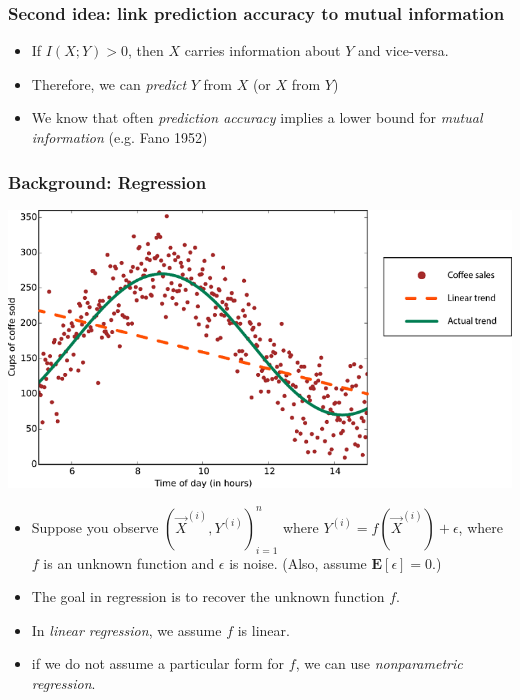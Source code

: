 \documentclass{beamer}
\newcommand{\E}{\textbf{E}}
\begin{document}
\begin{frame}
\frametitle{Second idea: link prediction accuracy to mutual information}
\begin{itemize}
\item If $I(X; Y) > 0$, then $X$ carries information about $Y$ and vice-versa. \pause
\item Therefore, we can \emph{predict} $Y$ from $X$ (or $X$ from $Y$) \pause
\item We know that often \emph{prediction accuracy} implies a lower bound for \emph{mutual information} (e.g. Fano 1952)
\end{itemize}
\end{frame}

\begin{frame}
\frametitle{Background: Regression}
\begin{center}
\includegraphics[scale = 0.2]{data_trend.png}
\end{center}
\begin{itemize}
\item Suppose you observe $(\vec{X}^{(i)}, Y^{(i)})_{i=1}^n$ where $Y^{(i)} = f(\vec{X}^{(i)}) + \epsilon$, where $f$ is an unknown function and $\epsilon$ is noise.  (Also, assume $\E[\epsilon] = 0$.)\pause
\item The goal in regression is to recover the unknown function $f$.\pause
\item In \emph{linear regression}, we assume $f$ is linear. \pause
\item if we do not assume a particular form for $f$, we can use \emph{nonparametric regression}.
\end{itemize}
\end{frame}
\end{document}
